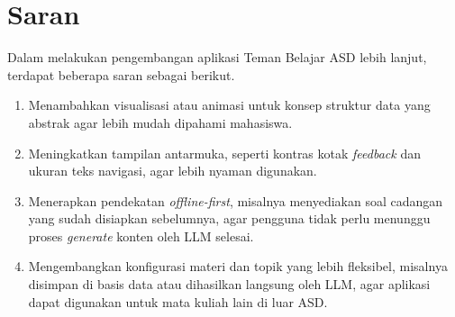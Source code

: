 \section{Saran}

Dalam melakukan pengembangan aplikasi Teman Belajar ASD lebih lanjut, terdapat beberapa saran sebagai berikut.

\begin{enumerate}
    \item Menambahkan visualisasi atau animasi untuk konsep struktur data yang abstrak agar lebih mudah dipahami mahasiswa.

    \item Meningkatkan tampilan antarmuka, seperti kontras kotak \textit{feedback} dan ukuran teks navigasi, agar lebih nyaman digunakan.

    \item Menerapkan pendekatan \textit{offline-first}, misalnya menyediakan soal cadangan yang sudah disiapkan sebelumnya, agar pengguna tidak perlu menunggu proses \textit{generate} konten oleh LLM selesai.

    \item Mengembangkan konfigurasi materi dan topik yang lebih fleksibel, misalnya disimpan di basis data atau dihasilkan langsung oleh LLM, agar aplikasi dapat digunakan untuk mata kuliah lain di luar ASD.
\end{enumerate}

